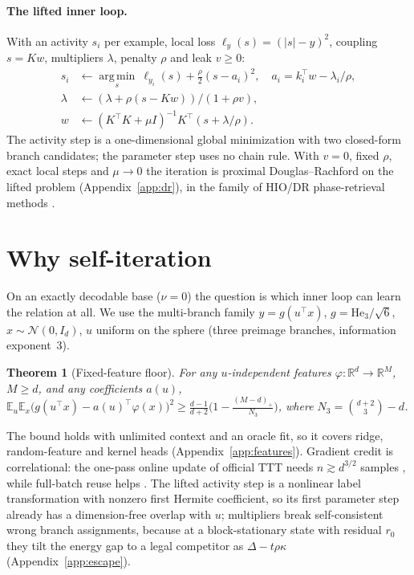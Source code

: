\documentclass{article}
\newtheorem{theorem}{Theorem}
\theoremstyle{definition}
\theoremstyle{remark}
\newcommand{\Ex}{\mathbb{E}}
\newcommand{\Rl}{\mathbb{R}}
\begin{document}
\paragraph{The lifted inner loop.}
With an activity $s_i$ per example, local loss $\ell_y(s)=(|s|-y)^2$, coupling $s=Kw$, multipliers $\lambda$, penalty $\rho$ and leak $v\geq0$:
\begin{align}
s_i&\leftarrow \operatorname*{arg\,min}_s\ \ell_{y_i}(s)+\tfrac{\rho}{2}(s-a_i)^2,\quad a_i=k_i^\top w-\lambda_i/\rho, \label{eq:act}\\
\lambda&\leftarrow(\lambda+\rho(s-Kw))/(1+\rho v),\label{eq:mult}\\
w&\leftarrow(K^\top K+\mu I)^{-1}K^\top(s+\lambda/\rho). \label{eq:ls}
\end{align}
The activity step is a one-dimensional global minimization with two closed-form branch candidates; the parameter step uses no chain rule.
With $v=0$, fixed $\rho$, exact local steps and $\mu\to0$ the iteration is proximal Douglas--Rachford on the lifted problem (Appendix~\ref{app:dr}), in the family of HIO/DR phase-retrieval methods \citep{fienup1982phase,bauschke2002phase}.

\section{Why self-iteration}
\label{sec:why}

On an exactly decodable base ($\nu=0$) the question is which inner loop can learn the relation at all.
We use the multi-branch family $y=g(u^\top x)$, $g=\mathrm{He}_3/\sqrt6$, $x\sim\mathcal N(0,I_d)$, $u$ uniform on the sphere (three preimage branches, information exponent~3).

\begin{theorem}[Fixed-feature floor]
\label{thm:features}
For any $u$-independent features $\varphi:\Rl^d\to\Rl^M$, $M\geq d$, and any coefficients $a(u)$,
$\Ex_u\Ex_x\big(g(u^\top x)-a(u)^\top\varphi(x)\big)^2\geq \frac{d-1}{d+2}\big(1-\frac{(M-d)_+}{N_3}\big)$, where $N_3=\binom{d+2}{3}-d$.
\end{theorem}

The bound holds with unlimited context and an oracle fit, so it covers ridge, random-feature and kernel heads (Appendix~\ref{app:features}).
Gradient credit is correlational: the one-pass online update of official TTT needs $n\gtrsim d^{3/2}$ samples \citep{benarous2021online,damian2023smoothing}, while full-batch reuse helps \citep{dandi2024reuse,lee2024neural}.
The lifted activity step is a nonlinear label transformation with nonzero first Hermite coefficient, so its first parameter step already has a dimension-free overlap with $u$; multipliers break self-consistent wrong branch assignments, because at a block-stationary state with residual $r_0$ they tilt the energy gap to a legal competitor as $\Delta-t\rho\kappa$ (Appendix~\ref{app:escape}).
\end{document}
